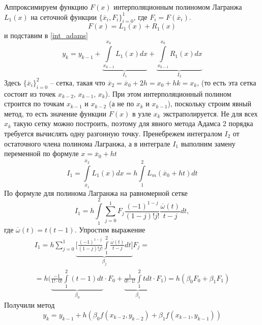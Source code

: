 \documentclass[a4paper, 12pt]{article}
\theoremstyle{mythm}
\begin{document}
	Аппроксимируем функцию $F(x)$ интерполяционным полиномом Лагранжа $L_1(x)$ на сеточной функции $\{\overline{x}_i, F_i\}_{i=0}^1$, где $F_i= F(\overline{x}_i)$.
	\begin{equation}
		F(x) = L_1(x) + R_1(x)
	\end{equation} 
	и подставим в \eqref{int_adams}
	\begin{equation}
		y_k=y_{k-1}+\underbrace{\int\limits_{x_{k-1}}^{x_k}L_1(x)dx}_{I_1} + \underbrace{\int\limits_{x_{k-1}}^{x_k}R_1(x)dx}_{I_2}
	\end{equation}
	Здесь $\{\overline{x}_i\}_{i=0}^2$ -- сетка, такая что $\overline{x}_2=\overline{x}_0+2h=x_0+hk=x_k$, (то есть эта сетка состоит из точек $x_{k-2}$, $x_{k-1}$, $x_{k}$). При этом интерполяционный полином строится по точкам $x_{k-1}$ и $x_{k-2}$ (а не по $x_{k}$ и $x_{k-1}$), поскольку строим явный метод, то есть значение функции $F(x)$ в узле $x_k$ экстраполируется. Не для всех $x_k$ такую сетку можно построить, поэтому для явного метода Адамса 2 порядка требуется вычислять одну разгонную точку.
	Пренебрежем интегралом $I_2$ от остаточного члена полинома Лагранжа, а в интеграле $I_1$ выполним замену переменной по формуле $x=\overline{x}_0+ht$
	\begin{equation}
		I_1=\int\limits_{\overline{x}_{1}}^{\overline{x}_2}L_1(x)dx=h\int\limits_{1}^{2}L_m(\overline{x}_0+ht)dt
	\end{equation}
	По формуле для полинома Лагранжа на равномерной сетке
	\begin{equation}
		I_1=h\int\limits_{1}^{2}\sum\limits_{j=0}^1F_j\frac{(-1)^{1-j}}{(1-j)!j!}\frac{\overline{\omega}(t)}{t-j}dt,
	\end{equation}
	где $\displaystyle \overline{\omega}(t)=t(t-1)$. Упростим выражение
	\begin{equation}
		\begin{gathered}
		I_1=h\sum\limits_{j=0}^1\underbrace{\bigg[\frac{(-1)^{1-j}}{(1-j)!j!}\int\limits_{1}^2\frac{\overline{\omega}(t)}{t-j}dt\bigg]}_{\beta_j}F_j=\\=h\bigg(\underbrace{\frac{-1}{1!\cdot0!}\int\limits_1^2(t-1)dt}_{\beta_0}\cdot F_0 + \underbrace{\frac{1}{0!\cdot1!}\int\limits_1^2tdt}_{\beta_1}\cdot F_1\bigg)=h(\beta_{0}F_0+\beta_{1}F_1)
		\end{gathered}
	\end{equation}
	Получили метод
	\begin{equation}
		y_{k}=y_{k-1}+h(\beta_0f(x_{k-2}, y_{k-2})+\beta_1f(x_{k-1}, y_{k-1}))
	\end{equation} 
	
\end{document}
